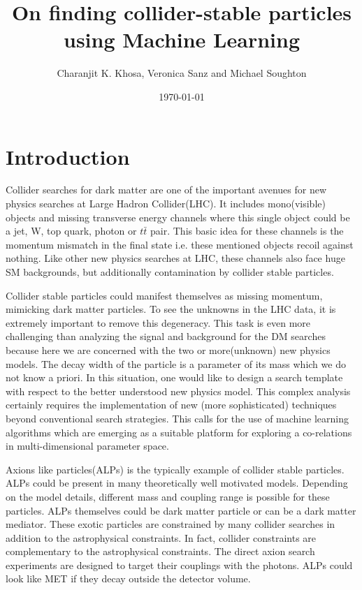 \documentclass[aps,onecolumn,showpacs,superscriptaddress,groupedaddress,nofootinbib,preprint]{revtex4-1}
\begin{document}
\title{On finding collider-stable particles using Machine Learning}
 
\author{Charanjit K. Khosa, Veronica Sanz and Michael Soughton} 
\date{\today}

\maketitle 

\section{Introduction}
Collider searches for dark matter are one of the important avenues for new physics searches at Large Hadron Collider(LHC). It 
 includes mono(visible) objects and missing transverse energy channels where this single object could be a jet, W, top quark, 
photon or $ t \bar t $ pair. This basic idea for these channels is the momentum mismatch in the final state i.e. these mentioned 
objects recoil against nothing. Like other new physics searches at LHC, these channels also face huge SM backgrounds, 
but additionally  contamination by  collider stable particles. 

Collider stable particles could manifest themselves as missing momentum, mimicking dark matter particles. To see the 
unknowns in the LHC data, it is extremely important to remove this degeneracy. This task is even more challenging than
 analyzing the signal and background for the DM searches because here we are concerned with the two or more(unknown) new 
 physics models. The decay width of the particle is a parameter of its mass which we do not know a priori. In this situation, one would like to 
 design a search template with respect to the better understood new physics model. This complex analysis certainly requires the implementation of new (more sophisticated) techniques beyond  conventional search strategies. This calls for the use of machine learning algorithms which are emerging as a suitable platform for exploring a co-relations in multi-dimensional parameter space.

Axions like particles(ALPs) is the 
typically example of collider stable particles. ALPs could be present in many theoretically well motivated models. Depending on 
the model details, different mass and coupling range is possible for these particles. ALPs themselves could be dark matter particle\cite{} or
 can be a dark matter mediator. These exotic particles are constrained by many collider searches in addition to 
 the astrophysical constraints. In fact, collider constraints are complementary to the astrophysical constraints\cite{}. The direct 
 axion search experiments are designed to target their couplings with the photons. ALPs could look like MET if they decay outside the detector volume.
 
\end{document}
